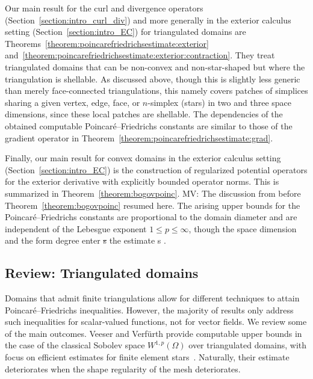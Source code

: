 \documentclass[10pt,a4paper]{article}
\newcommand\cye[1]{%
\protect\leavevmode
\begingroup
    \color{blue}%
    #1%
\endgroup
}
\newcommand{\mwl}[1]{{\color{red}#1}}
\begin{document}
\cye{Our main result for the curl and divergence operators (Section~\ref{section:intro_curl_div}) and more generally in the exterior calculus setting (Section~\ref{section:intro_EC}) for triangulated domains are Theorems~\ref{theorem:poincarefriedrichsestimate:exterior} and~\ref{theorem:poincarefriedrichsestimate:exterior:contraction}.
They treat triangulated domains that can be non-convex and non-star-shaped but where the triangulation is shellable. As discussed above, though this is slightly less generic than merely face-connected triangulations, this namely covers patches of simplices sharing a given vertex, edge, face, or $n$-simplex (stars) in two and three space dimensions, since these local patches are shellable. The dependencies of the obtained computable Poincar\'e--Friedrichs constants are similar to those of the gradient operator in Theorem~\ref{theorem:poincarefriedrichsestimate:grad}.}

\cye{Finally, our main result for convex domains in the exterior calculus setting (Section~\ref{section:intro_EC}) is the construction} of regularized potential operators for the exterior derivative with explicitly bounded operator norms. \cye{This is summarized in Theorem~\ref{theorem:bogovpoinc}.} \mwl{MV: The discussion from before Theorem~\ref{theorem:bogovpoinc} resumed here.} \cye{The arising upper bounds for} the Poincar\'e--Friedrichs constants are proportional to the domain diameter and are independent of the Lebesgue exponent $1 \leq p \leq \infty$, though the \cye{space} dimension and the form degree enter\cye{\sout{s}} the estimate\cye{s}. 


\subsection{Review: Triangulated domains}

Domains that admit finite triangulations allow for different techniques to attain Poincar\'e--Friedrichs inequalities. 
However, the majority of results only address such inequalities for scalar-valued functions, not for vector fields. 
We review some of the main outcomes. 
Veeser and Verf\"urth provide computable upper bounds in the case of the classical Sobolev space $W^{1,p}(\Omega)$ over triangulated domains, with focus on efficient estimates for finite element stars~\cite{veeser2012poincare}. Naturally, their estimate deteriorates when the shape regularity of the mesh deteriorates. 
\end{document}

